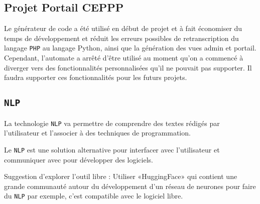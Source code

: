 \subsection{Projet Portail CEPPP}
Le générateur de code a été utilisé en début de projet et à fait économiser du temps de développement et réduit les erreurs possibles de retranscription du langage \texttt{PHP} au langage Python, ainsi que la génération des vues admin et portail. Cependant, l’automate a arrêté d’être utilisé au moment qu’on a commencé à diverger vers des fonctionnalités personnalisées qu’il ne pouvait pas supporter. Il faudra supporter ces fonctionnalités pour les futurs projets.


\subsection{\texttt{NLP}}
La technologie \texttt{NLP} va permettre de comprendre des textes rédigés par l’utilisateur et l’associer à des techniques de programmation.



Le \texttt{NLP} est une solution alternative pour interfacer avec l’utilisateur et communiquer avec pour développer des logiciels.

Suggestion d’explorer l’outil libre : Utiliser «HuggingFace» qui contient une grande communauté autour du développement d’un réseau de neurones pour faire du \texttt{NLP} par exemple, c’est compatible avec le logiciel libre.



